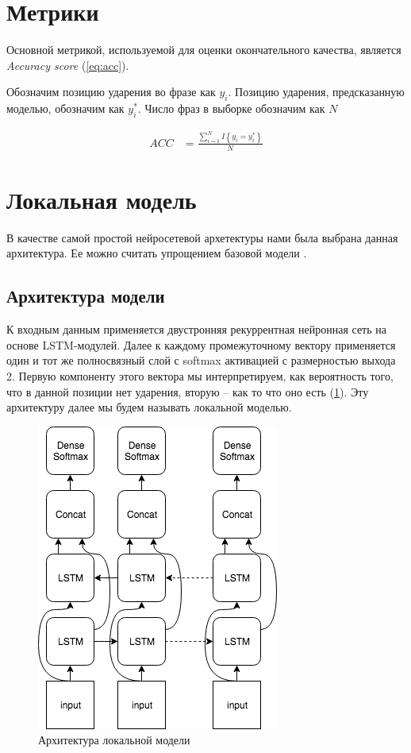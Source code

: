 \documentclass[14pt, a4paper, russian]{extreport}
\begin{document}
\section{Метрики}
Основной метрикой, используемой для оценки окончательного качества, является \textit{Accuracy score}  (\ref{eq:acc}). 

Обозначим позицию ударения во фразе как $y_i$. Позицию ударения, предсказанную моделью, обозначим как $y^*_i$. Число фраз в выборке обозначим как $N$

\begin{align}
\label{eq:acc} ACC &= \frac{\sum\limits_{i=1}^{N}I \left\{y_i = y^*_i\right\}}{N} 
\end{align}

\section{Локальная модель}
В качестве самой простой нейросетевой архетектуры нами была выбрана данная архитектура. Ее можно считать упрощением базовой модели \cite{ponomareva}.
\subsection{Архитектура модели}
К входным данным применяется двустронняя рекуррентная нейронная сеть на основе LSTM-модулей. Далее к каждому промежуточному вектору применяется один и тот же полносвязный слой с softmax активацией с размерностью выхода 2. Первую компоненту этого вектора мы интерпретируем, как вероятность того, что в данной позиции нет ударения, вторую -- как то что оно есть (\cref{fig:local}). Эту архитектуру далее мы будем называть локальной моделью. 

\begin{figure}[H]
	\begin{center}
		\includegraphics[width=0.5\linewidth]{Local}
	\end{center}
	\caption{\small{Архитектура локальной модели}}
	\label{fig:local}
\end{figure}
\end{document}
